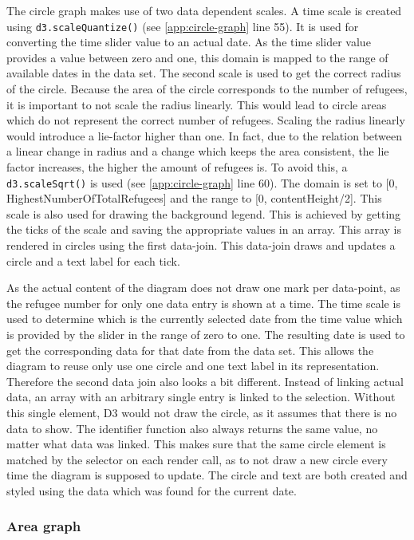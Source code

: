The circle graph makes use of two data dependent scales. A time scale is created using \texttt{d3.scaleQuantize()} (see \ref{app:circle-graph} line 55). It is used for converting the time slider value to an actual date. As the time slider value provides a value between zero and one, this domain is mapped to the range of available dates in the data set. The second scale is used to get the correct radius of the circle. Because the area of the circle corresponds to the number of refugees, it is important to not scale the radius linearly. This would lead to circle areas which do not represent the correct number of refugees. Scaling the radius linearly would introduce a lie-factor higher than one. In fact, due to the relation between a linear change in radius and a change which keeps the area consistent, the lie factor increases, the higher the amount of refugees is. To avoid this, a \texttt{d3.scaleSqrt()} is used (see \ref{app:circle-graph} line 60). The domain is set to [0, HighestNumberOfTotalRefugees] and the range to [0, contentHeight/2]. This scale is also used for drawing the background legend. This is achieved by getting the ticks of the scale and saving the appropriate values in an array. This array is rendered in circles using the first data-join. This data-join draws and updates a circle and a text label for each tick.

As the actual content of the diagram does not draw one mark per data-point, as the refugee number for only one data entry is shown at a time. The time scale is used to determine which is the currently selected date from the time value which is provided by the slider in the range of zero to one. The resulting date is used to get the corresponding data for that date from the data set. This allows the diagram to reuse only use one circle and one text label in its representation. Therefore the second data join also looks a bit different. Instead of linking actual data, an array with an arbitrary single entry is linked to the selection. Without this single element, D3 would not draw the circle, as it assumes that there is no data to show. The identifier function also always returns the same value, no matter what data was linked. This makes sure that the same circle element is matched by the selector on each render call, as to not draw a new circle every time the diagram is supposed to update. The circle and text are both created and styled using the data which was found for the current date.

\subsubsection{Area graph}

